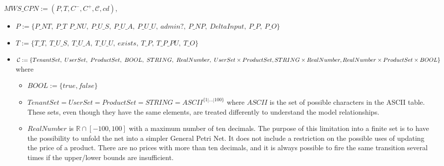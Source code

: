 \documentclass[12pt,english]{article} %
\begin{document}
$MWS\_CPN := (P, T, C^-, C^+, \mathcal{C}, cd)$,
\begin{itemize}
    \item $P := \{P\_NT,\ P\_T\,
        \ P\_NU,\ P\_U\_S,\ P\_U\_A,\ P\_U\_U,\ admin?,\ 
        P\_NP,\ DeltaInput,\ P\_P,\  
        P\_O\}$
    \item $T := \{T\_T,\ 
        T\_U\_S,\ T\_U\_A,\ T\_U\_U,\ exists,\ 
        T\_P,\ T\_P\_PU,\ 
        T\_O\}$
    \item $\mathcal{C} := \{TenantSet,\ UserSet,\ ProductSet,\  BOOL,\ STRING,\ RealNumber,\ UserSet\times ProductSet,\\
        STRING\times RealNumber, RealNumber\times ProductSet \times BOOL\}$ where 
    \begin{itemize}
        \item $BOOL := \{true, false\}$
        \item $TenantSet = UserSet = ProductSet = STRING = ASCII^{\{1|...|100\}}$ where $ASCII$ is the set of possible characters in the ASCII table.
        These sets, even though they have the same elements, are treated differently to understand the model relationships.
        \item $RealNumber$ is $\mathbb{R}\cap[-100,100]$ with a maximum number of ten decimals.
        The purpose of this limitation into a finite set is to have the possibility to unfold the net into a simpler General Petri Net.
        It does not include a restriction on the possible uses of updating the price of a product.
        There are no prices with more than ten decimals, and it is always possible to fire the same transition several times if the upper/lower bounds are insufficient.
    \end{itemize}


\end{itemize}
\end{document}
